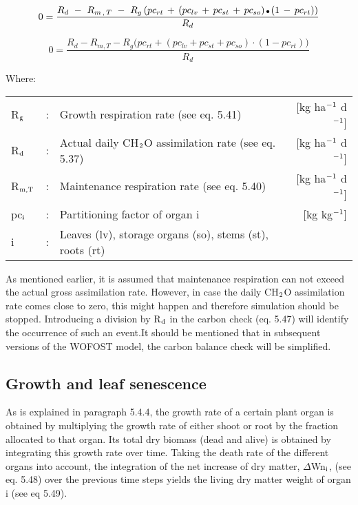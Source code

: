 \begin{equation}
0 = {\frac{R _{d} ~-~ R _{m\, ,\, T} ~-~ R _{g} \, (pc _{rt} \, +\, (pc _{lv} \, +\, pc _{st} \, +\, pc _{so} )\, {\rm \Bullet{0.75ex}}\, (1\, -\, pc _{rt} ))}{R_{d}}}  
\end{equation}

\begin{equation}
0 = {\frac{R_{d} - R_{m,T} - R_{g} \big( pc_{rt} + (pc_{lv} + pc_{st} + pc_{so}) \cdot (1 - pc_{rt}) \big) }{R_d}}  
\end{equation}

Where:\\[5pt]
\begin{tabularx}{\textwidth}{llXr}
R$_{{\rm g}}$ &:& Growth respiration rate (see eq. 5.41)   &
     [kg ha$^{{\rm -1}}$ d$^{{\rm -1}}$]\\
R$_{{\rm d}}$ &:& Actual daily CH$_{{\rm 2}}$O assimilation rate (see eq. 5.37)   &
     [kg ha$^{{\rm -1}}$ d$^{{\rm -1}}$]\\
R$_{{\rm m,T}}$ &:& Maintenance respiration rate (see eq. 5.40)   &
     [kg ha$^{{\rm -1}}$ d$^{{\rm -1}}$]\\
pc$_{{\rm i}}$ &:& Partitioning factor of organ i    &
     [kg kg$^{{\rm -1}}$]\\
i &:& Leaves (lv), storage organs (so), stems (st), roots (rt)\\
\end{tabularx}

As mentioned earlier, it is assumed that maintenance respiration can not exceed the actual
gross assimilation rate. However, in case the daily CH$_{{\rm 2}}$O assimilation rate comes close to
zero, this might happen and therefore simulation should be stopped. Introducing a
division by R$_{{\rm d}}$ in the carbon check (eq. 5.47) will identify the occur\-rence of such an
event.It should be mentioned that in subsequent versions of the WOFOST model, the carbon
balance check will be simplified.

\subsection{Growth and leaf senescence  }

As is explained in paragraph 5.4.4, the growth rate of a certain plant organ is obtained by
multi\-plying the growth rate of either shoot or root by the fraction allocated to that organ.
Its total dry biomass (dead and alive) is obtained by integrating this growth rate over
time. Taking the death rate of the different organs into account, the integration of the net
increase of dry matter, $\Delta$Wn$_{{\rm i}}$, (see eq. 5.48) over the previous time steps 
yields the living dry matter weight of organ i (see eq 5.49).

